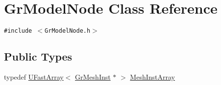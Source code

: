 \hypertarget{class_gr_model_node}{
\section{GrModelNode Class Reference}
\label{class_gr_model_node}
}
{\tt \#include $<$GrModelNode.h$>$}

\subsection*{Public Types}
\begin{CompactItemize}
\item 
typedef \hyperlink{class_u_fast_array}{UFastArray}$<$ \hyperlink{class_gr_mesh_inst}{GrMeshInst} $\ast$ $>$ \hyperlink{class_gr_model_node_7476f52e379fe6e8778e1f990343cee0}{MeshInstArray}
\end{CompactItemize}
